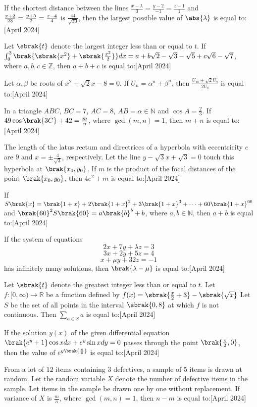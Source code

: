 \iffalse
\title{2024}
\author{ee24btech11009}
\section{integer}
\fi
\item If the shortest distance between the lines $\frac{x-\lambda}{3}=\frac{y-2}{-1}=\frac{z-1}{1}$ and $\frac{x+2}{2\-3}=\frac{y+5}{2}=\frac{z-4}{4}$ is $\frac{44}{\sqrt{30}}$, then the largest possible value of $\abs{\lambda}$ is equal to:\hfill{[April 2024]}
\item Let $\sbrak{t}$ denote the largest integer less than or equal to $t$. If $\int_{0}^{3}\brak{\sbrak{x^{2}}+\sbrak{\frac{x^{2}}{2}}}dx=a+b\sqrt{2}-\sqrt{3}-\sqrt{5}+c\sqrt{6}-\sqrt{7}$, where $a, b, c\in\mathbb{Z}$, then $a+b+c$ is equal to:\hfill{[April 2024]}

\item Let $\alpha, \beta$ be roots of $x^{2}+\sqrt{2}x-8=0$. If $U_{n}=\alpha^{n}+\beta^{n}$, then $\frac{U_{10}+\sqrt{2}U_{9}}{2U_{8}}$ is equal to:\hfill{[April 2024]}

\item In a triangle $ABC$, $BC=7$, $AC=8$, $AB=\alpha\in\mathbb{N}$ and $\cos A=\frac{2}{3}$. If $49\cos\brak{3C}+42=\frac{m}{n}$, where $\gcd(m,n)=1$, then $m+n$ is equal to:\hfill{[April 2024]}

\item The length of the latus rectum and directrices of a hyperbola with eccentricity $e$ are $9$ and $x=\pm\frac{4}{\sqrt{3}}$, respectively. Let the line $y-\sqrt{3}x+\sqrt{3}=0$ touch this hyperbola at $\brak{x_{0},y_{0}}$. If $m$ is the product of the focal distances of the point $\brak{x_{0},y_{0}}$, then $4e^{2}+m$ is equal to:\hfill{[April 2024]}
\item If $S\brak{x}=\brak{1+x}+2\brak{1+x}^{2}+3\brak{1+x}^{3}+\cdots+60\brak{1+x}^{60}$ and $\brak{60}^2 S\brak{60}=a\brak{b}^{b}+b$, where $a, b\in\mathbb{N}$, then $a+b$ is equal to:\hfill{[April 2024]}
\item If the system of equations
\[2x+7y+\lambda z=3\]
\[3x+2y+5z=4\]
\[x+\mu y+32z=-1\]
has infinitely many solutions, then $\brak{\lambda-\mu}$ is equal to:\hfill{[April 2024]}
\item Let $\sbrak{t}$ denote the greatest integer less than or equal to $t$. Let $f:[0,\infty)\rightarrow \mathbb{R}$ be a function defined by
$f(x)=\sbrak{\frac{x}{2}+3}-\sbrak{\sqrt{x}}$
Let $S$ be the set of all points in the interval $\sbrak{0, 8}$ at which $f$ is not continuous. Then $\displaystyle \sum_{a\in S}a$ is equal to:\hfill{[April 2024]}
\item If the solution $y(x)$ of the given differential equation $\brak{e^{y}+1}\cos x dx+e^{y}\sin x dy=0$ passes through the point $\brak{\frac{\pi}{2},0}$, then the value of $e^{y\brak{\frac{\pi}{6}}}$ is equal to:\hfill{[April 2024]}
\item From a lot of $12$ items containing $3$ defectives, a sample of $5$ items is drawn at random. Let the random variable $X$ denote the number of defective items in the sample. Let items in the sample be drawn one by one without replacement. If variance of $X$ is $\frac{m}{n}$, where $\gcd(m,n)=1$, then $n-m$ is equal to:\hfill{[April 2024]}
